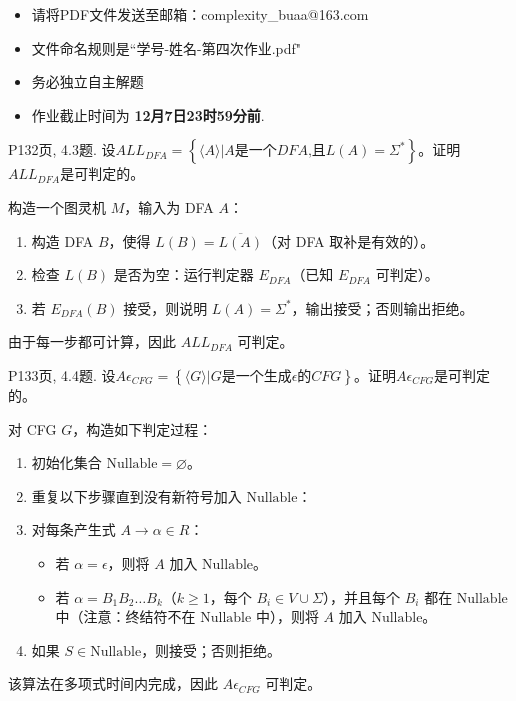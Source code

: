 \documentclass[11pt,addpoints,answers]{exam}
\newcommand{\duedate}{12月7日23时59分前} %
\begin{document}
\pagestyle{head}                %
\begin{itemize}
	\item 请将PDF文件发送至邮箱：complexity\_buaa@163.com
	\item 文件命名规则是``学号-姓名-第四次作业.pdf"
	\item 务必独立自主解题
	\item 作业截止时间为 \textbf{\duedate}.
\end{itemize}



\begin{questions}
	\question P132页, 4.3题.
	设$ALL_{\textit{DFA}}=\left\{ \langle A \rangle| A\text{是一个} \textit{DFA} \text{,且}L(A)=\Sigma ^{*} \right\}$。证明$ALL_{\textit{DFA}}$是可判定的。
	\begin{solution}
    
		构造一个图灵机 \(M\)，输入为 DFA \(A\)：
        \begin{enumerate}
            \item 构造 DFA \(B\)，使得 \(L(B) = \overline{L(A)}\)（对 DFA 取补是有效的）。
            \item 检查 \(L(B)\) 是否为空：运行判定器 \(E_{DFA}\)（已知 \(E_{DFA}\) 可判定）。
            \item 若 \(E_{DFA}(B)\) 接受，则说明 \(L(A) = \Sigma^*\)，输出接受；否则输出拒绝。
        \end{enumerate}
        由于每一步都可计算，因此 \(ALL_{DFA}\) 可判定。
	\end{solution}
	
	
	\question P133页, 4.4题.
	设$A\epsilon_{\textit{CFG}}=\left\{ \langle G \rangle| G\text{是一个生成} \epsilon \text{的} \textit{CFG} \right\}$。证明$A\epsilon_{ \textit{CFG}}$是可判定的。
	\begin{solution}
    
    对 CFG \(G\)，构造如下判定过程：
    \begin{enumerate}
        \item 初始化集合 $\text{Nullable} = \varnothing$。
        \item 重复以下步骤直到没有新符号加入 $\text{Nullable}$：
        \item 对每条产生式 $A \to \alpha \in R$：
        \begin{itemize}
            \item 若 $\alpha = \epsilon$，则将 $A$ 加入 $\text{Nullable}$。
            \item 若 $\alpha = B_1 B_2 \dots B_k$（$k \ge 1$，每个 $B_i \in V \cup \Sigma$），并且每个 $B_i$ 都在 $\text{Nullable}$ 中（注意：终结符不在 $\text{Nullable}$ 中），则将 $A$ 加入 $\text{Nullable}$。
        \end{itemize}
        \item 如果 $S \in \text{Nullable}$，则接受；否则拒绝。
    \end{enumerate}
    该算法在多项式时间内完成，因此 \(A\epsilon_{CFG}\) 可判定。
	\end{solution}  
	

\end{questions}
\end{document}
